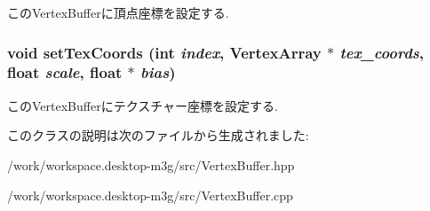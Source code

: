 このVertexBufferに頂点座標を設定する. \hypertarget{classm3g_1_1VertexBuffer_9fd3dd3f78138d654d18863e4f1329f4}{
\subsubsection[{setTexCoords}]{\setlength{\rightskip}{0pt plus 5cm}void setTexCoords (int {\em index}, \/  {\bf VertexArray} $\ast$ {\em tex\_\-coords}, \/  float {\em scale}, \/  float $\ast$ {\em bias})}}
\label{classm3g_1_1VertexBuffer_9fd3dd3f78138d654d18863e4f1329f4}


このVertexBufferにテクスチャー座標を設定する. 

このクラスの説明は次のファイルから生成されました:\begin{CompactItemize}
\item 
/work/workspace.desktop-m3g/src/VertexBuffer.hpp\item 
/work/workspace.desktop-m3g/src/VertexBuffer.cpp\end{CompactItemize}

